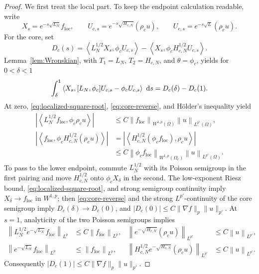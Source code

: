 \documentclass[12pt]{amsart}
\newcommand\dd{\,{\rm d}}
\newcommand{\ip}[2]{\left\langle #1,#2\right\rangle}
\newcommand{\norm}[2]{\left\lVert #1\right\rVert_{#2}}
\newcommand{\abs}[1]{\left\lvert #1\right\rvert}
\theoremstyle{remark}
\begin{document}
\begin{proof}
We first treat the local part.  To keep the endpoint calculation readable,
write
\[
 X_s=e^{-s\sqrt{L_N}}f_{\mathrm{loc}},\qquad
 U_{c,s}=e^{-s\sqrt{H_{c,N}}}(\rho_cu),\qquad
 U_{e,s}=e^{-s\sqrt L}(\rho_eu).
\]
For the core, set
\[
 D_c(s)=\ip{L_N^{1/2}X_s}{\phi_cU_{c,s}}
       -\ip{X_s}{\phi_cH_{c,N}^{1/2}U_{c,s}}.
\]
Lemma~\ref{lem:Wronskian}, with
$T_1=L_N$, $T_2=H_{c,N}$, and $\theta=\phi_c$, yields for
$0<\delta<1$
\begin{equation}\label{eq:core-Wronskian-truncated}
 \int_\delta^1\ip{X_s}
 {[L_N,\phi_c]U_{c,s}-\phi_cU_{c,s}}\,\dd s
 =D_c(\delta)-D_c(1).
\end{equation}
At zero, \eqref{eq:localized-square-root}, \eqref{eq:core-reverse}, and
H\"older's inequality yield
\begin{align*}
 \abs{\ip{L_N^{1/2}f_{\mathrm{loc}}}{\phi_c\rho_cu}}
 &\leq C\norm{f_{\mathrm{loc}}}{W^{1,p}(\Omega)}
          \norm u{L^{p'}(\Omega)},\\
 \abs{\ip{f_{\mathrm{loc}}}
 {\phi_cH_{c,N}^{1/2}(\rho_cu)}}
 &=\abs{\ip{H_{c,N}^{1/2}(\phi_cf_{\mathrm{loc}})}{\rho_cu}}\\
 &\leq C\norm{\phi_cf_{\mathrm{loc}}}{W^{1,p}(\Omega_c)}
          \norm u{L^{p'}(\Omega)}.
\end{align*}
To pass to the lower endpoint, commute $L_N^{1/2}$ with its Poisson
semigroup in the first pairing and move $H_{c,N}^{1/2}$ onto
$\phi_cX_\delta$ in the second.  The low-exponent Riesz bound,
\eqref{eq:localized-square-root}, and strong semigroup continuity imply
$X_\delta\to f_{\mathrm{loc}}$ in $W^{1,p}$; then
\eqref{eq:core-reverse} and the strong $L^{p'}$-continuity of the core
semigroup imply $D_c(\delta)\to D_c(0)$, and
$|D_c(0)|\leq C\|\nabla f\|_p\|u\|_{p'}$.  At $s=1$, analyticity of the
two Poisson semigroups implies
\begin{align*}
 \norm{L_N^{1/2}e^{-\sqrt{L_N}}f_{\mathrm{loc}}}{L^p}
 &\leq C\norm{f_{\mathrm{loc}}}{L^p},&
 \norm{e^{-\sqrt{H_{c,N}}}(\rho_cu)}{L^{p'}}
 &\leq C\norm u{L^{p'}},\\
 \norm{e^{-\sqrt{L_N}}f_{\mathrm{loc}}}{L^p}
 &\leq\norm{f_{\mathrm{loc}}}{L^p},&
 \norm{H_{c,N}^{1/2}e^{-\sqrt{H_{c,N}}}(\rho_cu)}{L^{p'}}
 &\leq C\norm u{L^{p'}}.
\end{align*}
Consequently $|D_c(1)|\leq
C\|\nabla f\|_p\|u\|_{p'}$.


\end{proof}
\end{document}
